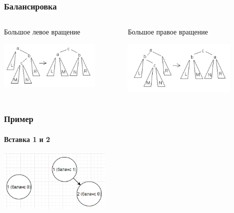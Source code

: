 \documentclass[xetex,mathserif,serif]{beamer}
\begin{document}
    \begin{frame}
        \frametitle{Балансировка}
        \begin{columns}
            \begin{column}{0.5\textwidth}
                Большое левое вращение
                \begin{center}
                    \includegraphics[width=0.8\textwidth]{big-left-rotation.png}
                \end{center}
            \end{column}
            \begin{column}{0.5\textwidth}
                Большое правое вращение
                \begin{center}
                    \includegraphics[width=0.8\textwidth]{big-right-rotation.png}
                \end{center}
            \end{column}
        \end{columns}
    \end{frame}

    \begin{frame}
        \frametitle{Пример}
        \framesubtitle{Вставка 1 и 2}
        \begin{center}
            \includegraphics[width=0.4\textwidth]{avl12.png}
        \end{center}
    \end{frame}
\end{document}
